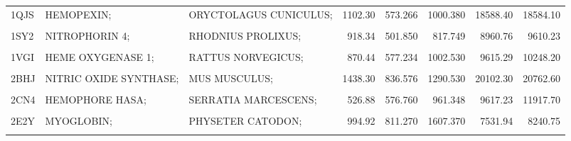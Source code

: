 \begin{table}
{\begin{tabular}{lllrrrrr}
				1QJS & HEMOPEXIN; & ORYCTOLAGUS CUNICULUS; & 1102.30 & 573.266 & 1000.380 & 18588.40 & 18584.10\\
				\addlinespace
				\cellcolor{gray!6}{1SI8} & \cellcolor{gray!6}{CATALASE;} & \cellcolor{gray!6}{ENTEROCOCCUS FAECALIS;} & \cellcolor{gray!6}{965.57} & \cellcolor{gray!6}{646.643} & \cellcolor{gray!6}{1184.070} & \cellcolor{gray!6}{23711.20} & \cellcolor{gray!6}{25120.40}\\
				1SY2 & NITROPHORIN 4; & RHODNIUS PROLIXUS; & 918.34 & 501.850 & 817.749 & 8960.76 & 9610.23\\
				\cellcolor{gray!6}{1U9U} & \cellcolor{gray!6}{CYTOCHROME B5;} & \cellcolor{gray!6}{BOS TAURUS;} & \cellcolor{gray!6}{738.55} & \cellcolor{gray!6}{496.132} & \cellcolor{gray!6}{813.773} & \cellcolor{gray!6}{4675.76} & \cellcolor{gray!6}{5632.32}\\
				1VGI & HEME OXYGENASE 1; & RATTUS NORVEGICUS; & 870.44 & 577.234 & 1002.530 & 9615.29 & 10248.20\\
				\cellcolor{gray!6}{1ZVI} & \cellcolor{gray!6}{NITRIC-OXIDE SYNTHASE, BRAIN;} & \cellcolor{gray!6}{RATTUS NORVEGICUS;} & \cellcolor{gray!6}{1435.90} & \cellcolor{gray!6}{701.091} & \cellcolor{gray!6}{1129.540} & \cellcolor{gray!6}{19918.60} & \cellcolor{gray!6}{20968.20}\\
				\addlinespace
				2BHJ & NITRIC OXIDE SYNTHASE; & MUS MUSCULUS; & 1438.30 & 836.576 & 1290.530 & 20102.30 & 20762.60\\
				\cellcolor{gray!6}{2CJ0} & \cellcolor{gray!6}{CHLOROPEROXIDASE;} & \cellcolor{gray!6}{CALDARIOMYCES FUMAGO;} & \cellcolor{gray!6}{809.62} & \cellcolor{gray!6}{2653.180} & \cellcolor{gray!6}{4835.280} & \cellcolor{gray!6}{12749.60} & \cellcolor{gray!6}{12892.20}\\
				2CN4 & HEMOPHORE HASA; & SERRATIA MARCESCENS; & 526.88 & 576.760 & 961.348 & 9617.23 & 11917.70\\
				\cellcolor{gray!6}{2CPO} & \cellcolor{gray!6}{CHLOROPEROXIDASE;} & \cellcolor{gray!6}{LEPTOXYPHIUM FUMAGO;} & \cellcolor{gray!6}{886.17} & \cellcolor{gray!6}{1846.490} & \cellcolor{gray!6}{3329.540} & \cellcolor{gray!6}{13081.60} & \cellcolor{gray!6}{12995.60}\\
				2E2Y & MYOGLOBIN; & PHYSETER CATODON; & 994.92 & 811.270 & 1607.370 & 7531.94 & 8240.75\\
				\addlinespace
				\cellcolor{gray!6}{2FC2} & \cellcolor{gray!6}{NITRIC OXIDE SYNTHASE;} & \cellcolor{gray!6}{BACILLUS SUBTILIS;} & \cellcolor{gray!6}{1091.40} & \cellcolor{gray!6}{1011.190} & \cellcolor{gray!6}{1669.900} & \cellcolor{gray!6}{18383.50} & \cellcolor{gray!6}{18552.10}\\

\end{tabular}}
\end{table}
